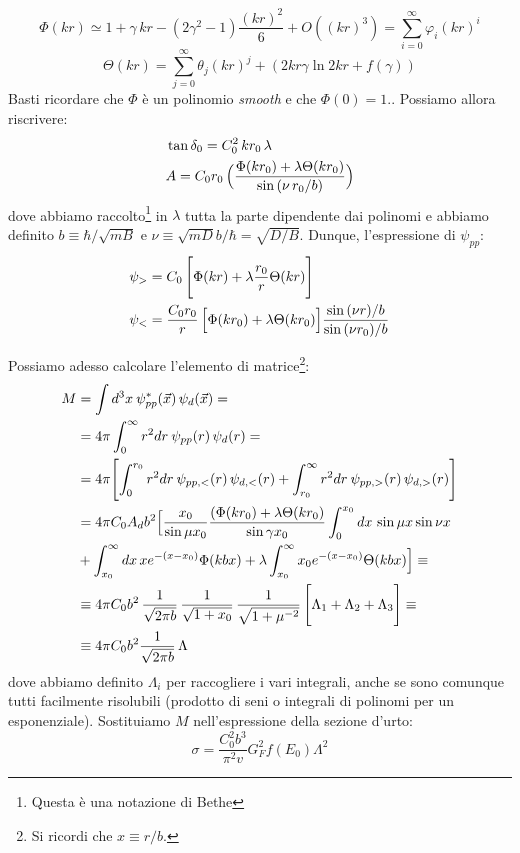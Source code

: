 \begin{itemize}
{    $$\Phi(kr)\simeq 1+\gamma\, kr - (2\gamma^2-1)\frac{(kr)^2}{6} + O((kr)^3) = \sum_{i=0}^\infty \varphi_i (kr)^i$$
    $$\Theta(kr) = \sum_{j=0}^\infty \theta_j (kr)^j + (2kr\gamma\ln{2kr}+f(\gamma))$$
    Basti ricordare che $\Phi$ è un polinomio \textit{smooth} e che $\Phi(0)=1$.}. Possiamo allora riscrivere:
    \begin{displaymath}
    \begin{aligned}
        &\tan{\delta_0} = C_0^2 \, kr_0 \, \lambda \\
        &A = C_0r_0\, \Bigl ( \frac{\Phi(kr_0)+\lambda\Theta(kr_0)}{\sin{(\nu \, r_0/b)}} \Bigr )            
    \end{aligned}
    \end{displaymath}
    dove abbiamo raccolto\footnote{Questa è una notazione di Bethe} in $\lambda$ tutta la parte dipendente dai polinomi e abbiamo definito $b\equiv \hbar/\sqrt{mB}$ e $\nu\equiv \sqrt{mD} b/\hbar = \sqrt{D/B}$. Dunque, l'espressione di $\psi_{pp}$:
    \begin{displaymath}
        \begin{aligned}
            \psi_> &= C_0\, \Biggl [ \Phi(kr) + \lambda \frac{r_0}{r}\Theta(kr) \Biggr ]\\ 
            \psi_< &= \frac{C_0r_0}{r} \, \Bigl [ \Phi(kr_0)+\lambda\Theta(kr_0) \Bigr ]\frac{\sin{(\nu r)/b}}{\sin{(\nu r_0)/b}}
        \end{aligned}
    \end{displaymath}
\end{itemize}
Possiamo adesso calcolare l'elemento di matrice\footnote{Si ricordi che $x\equiv r/b$.}:
\begin{displaymath}
    \begin{aligned}
        M&=\int d^3x \: \psi^*_{pp} (\vec{x})\, \psi_d(\vec{x})= \\ 
        &= 4\pi \int_0^\infty r^2 dr \: \psi_{pp} (r)\, \psi_d(r) = \\ 
        &=  4\pi \Biggl [  \int_0^{r_0} r^2 dr \: \psi_{pp,<} (r)\, \psi_{d,<}(r) + \int_{r_0}^\infty r^2 dr \: \psi_{pp,>} (r)\, \psi_{d,>}(r)  \Biggr ] \\ 
        &= 4\pi C_0 A_d b^2 \Bigl [ \frac{x_0}{\sin{\mu x_0}} \frac{(\Phi(kr_0)+\lambda\Theta(kr_0)}{\sin{\gamma x_0}} \int_0^{x_0} dx\, \sin{\mu x} \sin{\nu x} \\ 
        &+ \int_{x_0}^\infty dx\, xe^{-(x-x_0)}\Phi(kbx) + \lambda \int_{x_0}^\infty x_0 e^{-(x-x_0)}\Theta(kbx) \Bigr ] \equiv \\ 
        &\equiv 4\pi C_0 b^2 \, \frac{1}{\sqrt{2\pi b}}\, \frac{1}{\sqrt{1+x_0}}\,\frac{1}{\sqrt{1+\mu^{-2}}} \, \Biggl [ \Lambda_1+\Lambda_2+\Lambda_3 \Biggr ] \equiv \\ 
        &\equiv 4\pi C_0b^2 \frac{1}{\sqrt{2\pi b}} \, \Lambda
    \end{aligned}
\end{displaymath}
dove abbiamo definito $\Lambda_i$ per raccogliere i vari integrali, anche se sono comunque tutti facilmente risolubili (prodotto di seni o integrali di polinomi per un esponenziale). Sostituiamo $M$ nell'espressione della sezione d'urto:
$$ \sigma = \frac{C_0^2 b^3}{\pi^2 v} G_F^2 f(E_0) \Lambda^2 $$

